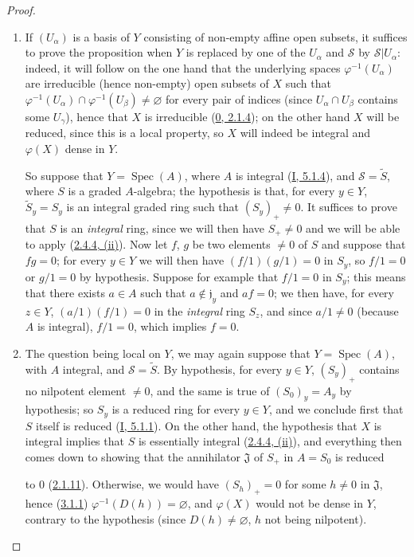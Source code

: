 \begin{proof}
\begin{enumerate}
  \item[\rm(i)] If $(U_\alpha)$ is a basis of $Y$ consisting of non-empty
    affine open subsets, it suffices to prove the proposition when $Y$ is
    replaced by one of the $U_\alpha$ and $\mathcal{S}$ by
    $\mathcal{S}|U_\alpha$: indeed, it will follow on the one hand that the
    underlying spaces $\varphi^{-1}(U_\alpha)$ are irreducible (hence
    non-empty) open subsets of $X$ such that
    $\varphi^{-1}(U_\alpha)\cap\varphi^{-1}(U_\beta)\neq\varnothing$ for every
    pair of indices (since $U_\alpha\cap U_\beta$ contains some $U_\gamma$),
    hence that $X$ is irreducible (\hyperref[0.2.1.4]{0, 2.1.4}); on the
    other hand $X$ will be reduced, since this is a local property, so $X$
    will indeed be integral and $\varphi(X)$ dense in $Y$.

    So suppose that $Y=\operatorname{Spec}(A)$, where $A$ is integral
    (\hyperref[I.5.1.4]{I, 5.1.4}), and $\mathcal{S}=\widetilde{S}$, where
    $S$ is a graded $A$-algebra; the hypothesis is that, for every $y\in Y$,
    $\widetilde{S}_y=S_y$ is an integral graded ring such that
    $(S_y)_+\neq0$. It suffices to prove that $S$ is an \emph{integral} ring,
    since we will then have $S_+\neq0$ and we will be able to apply
    (\hyperref[II.2.4.4]{2.4.4, (ii)}). Now let $f$, $g$ be two elements
    $\neq0$ of $S$ and suppose that $fg=0$; for every $y\in Y$ we will then
    have $(f/1)(g/1)=0$ in $S_y$, so $f/1=0$ or $g/1=0$ by hypothesis.
    Suppose for example that $f/1=0$ in $S_y$; this means that there exists
    $a\in A$ such that $a\notin\mathfrak{j}_y$ and $af=0$; we then have, for
    every $z\in Y$, $(a/1)(f/1)=0$ in the \emph{integral} ring $S_z$, and
    since $a/1\neq0$ (because $A$ is integral), $f/1=0$, which implies $f=0$.
  \item[\rm(ii)] The question being local on $Y$, we may again suppose
    that $Y=\operatorname{Spec}(A)$, with $A$ integral, and
    $\mathcal{S}=\widetilde{S}$. By hypothesis, for every $y\in Y$, $(S_y)_+$
    contains no nilpotent element $\neq0$, and the same is true of
    $(S_0)_y=A_y$ by hypothesis; so $S_y$ is a reduced ring for every
    $y\in Y$, and we conclude first that $S$ itself is reduced
    (\hyperref[I.5.1.1]{I, 5.1.1}). On the other hand, the hypothesis that
    $X$ is integral implies that $S$ is essentially integral
    (\hyperref[II.2.4.4]{2.4.4, (ii)}), and everything then comes down to
    showing that the annihilator $\mathfrak{J}$ of $S_+$ in $A=S_0$ is
    reduced


    to $0$
    (\hyperref[II.2.1.11]{2.1.11}). Otherwise, we would have
    $(S_h)_+=0$ for some $h\neq0$ in $\mathfrak{J}$, hence
    (\hyperref[II.3.1.1]{3.1.1}) $\varphi^{-1}(D(h))=\varnothing$, and
    $\varphi(X)$ would not be dense in $Y$, contrary to the hypothesis
    (since $D(h)\neq\varnothing$, $h$ not being nilpotent).
\end{enumerate}
\end{proof}

